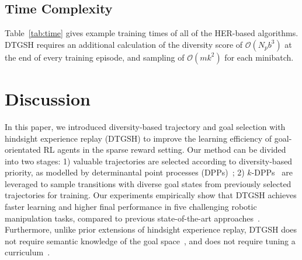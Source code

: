 \subsection{Time Complexity}
Table~\ref{tab:time} gives example training times of all of the HER-based algorithms. DTGSH requires an additional calculation of the diversity score of $\mathcal{O}(N_{p}b^3)$ at the end of every training episode, and sampling of $\mathcal{O}(mk^2)$ for each minibatch.
\begin{table}[h]
    \centering
    \vspace{0.2em}
    \caption{Training time (hours:minutes:seconds) of DTGSH and baseline approaches on the Push task for 50 epochs.}
    \label{tab:time}
\end{table}

\section{Discussion}
In this paper, we introduced diversity-based trajectory and goal selection with hindsight experience replay (DTGSH) to improve the learning efficiency of goal-orientated RL agents in the sparse reward setting. Our method can be divided into two stages: 1) valuable trajectories are selected according to diversity-based priority, as modelled by determinantal point processes (DPPs)~\cite{kulesza2012determinantal}; 2) $k$-DPPs~\cite{kulesza2011k} are leveraged to sample transitions with diverse goal states from previously selected trajectories for training. Our experiments empirically show that DTGSH achieves faster learning and higher final performance in five challenging robotic manipulation tasks, compared to previous state-of-the-art approaches~\cite{NIPS2017_453fadbd,fang2019curriculum,zhao2018energy}. Furthermore, unlike prior extensions of hindsight experience replay, DTGSH does not require semantic knowledge of the goal space~\cite{zhao2018energy}, and does not require tuning a curriculum~\cite{fang2019curriculum}.